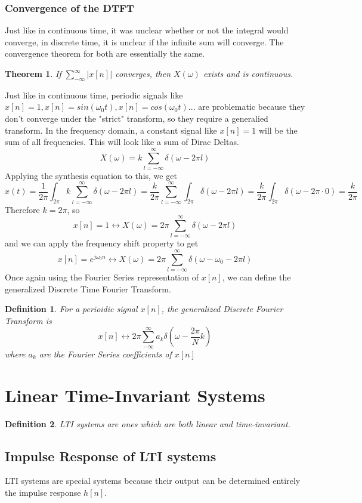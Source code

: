 \documentclass{article}
\newtheorem{theorem}{Theorem}
\newtheorem{definition}{Definition}
\begin{document}
\subsubsection{Convergence of the DTFT}
Just like in continuous time, it was unclear whether or not the integral would converge,
in discrete time, it is unclear if the infinite sum will converge. The convergence theorem for both are essentially the same.
\begin{theorem}
    If $\sum_{-\infty}^{\infty}{|x[n]|}$ converges, then $X(\omega)$ exists and is continuous.
\end{theorem}
Just like in continuous time, periodic signals like $x[n] = 1, x[n] = sin(\omega_0t), x[n]=cos(\omega_0t)...$
are problematic because they don't converge under the "strict" transform, so they require a generalied transform.
In the frequency domain, a constant signal like $x[n] = 1$ will be the sum of all frequencies. This will look like
a sum of Dirac Deltas.
$$X(\omega) = k \sum_{l=-\infty}^{\infty}{\delta(\omega - 2\pi l)}$$
Applying the synthesis equation to this, we get
$$x(t) = \frac{1}{2\pi}\int_{2\pi}{k \sum_{l=-\infty}^{\infty}{\delta(\omega - 2\pi l)}} = \frac{k}{2\pi}\sum_{l=-\infty}^{\infty}{\int_{2\pi}{\delta(\omega - 2\pi l)}} = \frac{k}{2\pi}\int_{2\pi}{\delta(\omega - 2\pi \cdot 0)} = \frac{k}{2\pi}$$
Therefore $k = 2\pi$, so
$$x[n] = 1 \leftrightarrow X(\omega) = 2\pi\sum_{l=-\infty}^{\infty}{\delta(\omega - 2\pi l)}$$
and we can apply the frequency shift property to get
$$x[n] = e^{j\omega_0n} \leftrightarrow X(\omega) = 2\pi\sum_{l=-\infty}^{\infty}{\delta(\omega - \omega_0 - 2\pi l)}$$
Once again using the Fourier Series representation of $x[n]$, we can define the generalized Discrete Time Fourier Transform.
\begin{definition}
    For a perioidic signal $x[n]$, the generalized Discrete Fourier Transform is
    $$x[n] \leftrightarrow 2\pi\sum_{-\infty}^{\infty}{a_k\delta(\omega-\frac{2\pi}{N}k)}$$
    where $a_k$ are the Fourier Series coefficients of $x[n]$
\end{definition}
\section{Linear Time-Invariant Systems}
\begin{definition}
    LTI systems are ones which are both linear and time-invariant.
\end{definition}
\subsection{Impulse Response of LTI systems}
LTI systems are special systems because their output can be determined entirely the impulse response $h[n]$.
\end{document}
